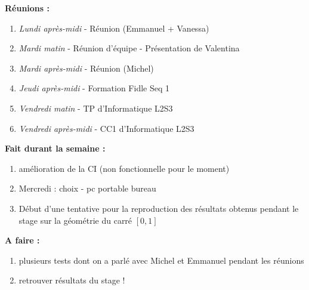 \textbf{Réunions :}
\begin{enumerate}[label=\textbullet]
	\item \textit{Lundi après-midi} - Réunion (Emmanuel + Vanessa)
	\item \textit{Mardi matin} - Réunion d'équipe - Présentation de Valentina
	\item \textit{Mardi après-midi} - Réunion (Michel)
	\item \textit{Jeudi après-midi} - Formation Fidle Seq 1
	\item \textit{Vendredi matin} - TP d'Informatique L2S3
	\item \textit{Vendredi après-midi} - CC1 d'Informatique L2S3
\end{enumerate}
\textbf{Fait durant la semaine :}
\begin{enumerate}[label=\textbullet]
	\item amélioration de la CI (non fonctionnelle pour le moment)
	\item Mercredi : choix - pc portable bureau 
	\item Début d'une tentative pour la reproduction des résultats obtenus pendant le stage sur la géométrie du carré $[0,1]$ 
\end{enumerate}
\textbf{A faire :}
\begin{enumerate}[label=\textbullet]
	\item plusieurs tests dont on a parlé avec Michel et Emmanuel pendant les réunions
	\item retrouver résultats du stage !
\end{enumerate}